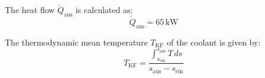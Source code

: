 The heat flow \( \dot{Q}_{\text{aus}} \) is calculated as:  
\[
\dot{Q}_{\text{aus}} = 65 \, \text{kW}
\]  

The thermodynamic mean temperature \( T_{\text{KF}} \) of the coolant is given by:  
\[
T_{\text{KF}} = \frac{\int_{s_{\text{ein}}}^{s_{\text{aus}}} T \, ds}{s_{\text{aus}} - s_{\text{ein}}}
\]